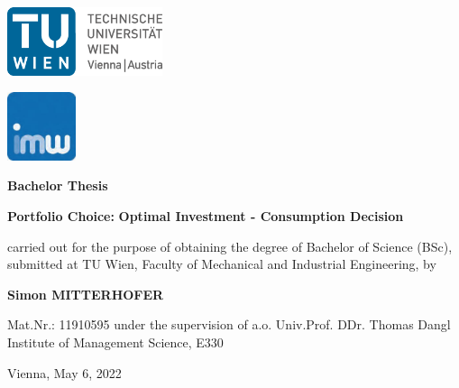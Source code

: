 \begin{titlepage}
    \begin{minipage}{0.6\textwidth}
        \includegraphics[height=2cm]{files/TULogo.png}
    \end{minipage}\hfill
    \begin{minipage}{0.4\textwidth}
        \hfill \includegraphics[height=2cm]{files/logo-imw.jpg}
    \end{minipage}
    
    \begin{center}  
        \vskip 2cm
        {\LARGE \textbf{Bachelor Thesis}}
    
    
    
        \vskip 2cm
    
        {\huge \bfseries Portfolio Choice:}
        \vskip 5mm
        {\LARGE \bfseries Optimal Investment - Consumption Decision}
        \vskip 2cm
    
    

        {\large carried out for the purpose of obtaining the degree of}
        \vskip 3mm
        {\large Bachelor of Science (BSc),}
        \vskip 3mm
        {\large submitted at TU Wien, Faculty of Mechanical and Industrial Engineering, by}
   
        \vskip 2cm
        {\LARGE\bfseries Simon MITTERHOFER}
        
        \vskip 0.5cm
        {\large Mat.Nr.: 11910595}
        \vskip 2cm
        {\large under the supervision of}
        \vskip 5mm
        {\Large a.o. Univ.Prof. DDr. Thomas Dangl}
        \vskip 5mm
        {\Large Institute of Management Science, E330}
    
  \end{center}
  
  \vfill
  
  \begin{center}
       {\Large Vienna, May 6, 2022}
  \end{center}

  \vspace*{-15mm}
\end{titlepage}
